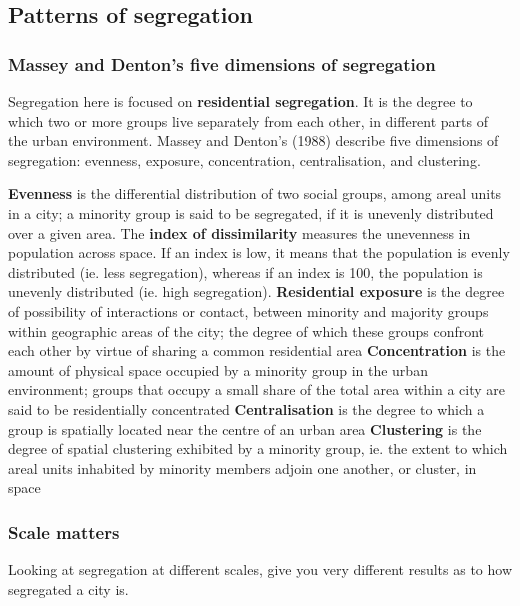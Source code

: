 \documentclass{article}
\begin{document}
\subsection{Patterns of segregation}

\subsubsection{Massey and Denton’s five dimensions of segregation}

Segregation here is focused on \textbf{residential segregation}. It is the degree to which two or more groups live separately from each other, in different parts of the urban environment. Massey and Denton’s (1988) describe five dimensions of segregation: evenness, exposure, concentration, centralisation, and clustering.

\begin{outline}
	\1 \textbf{Evenness} is the differential distribution of two social groups, among areal units in a city; a minority group is said to be segregated, if it is unevenly distributed over a given area.
	The \textbf{index of dissimilarity} measures the unevenness in population across space. If an index is low, it means that the population is evenly distributed (ie. less segregation), whereas if an index is 100, the population is unevenly distributed (ie. high segregation). 
	\1 \textbf{Residential exposure} is the degree of possibility of interactions or contact, between minority and majority groups within geographic areas of the city; the degree of which these groups confront each other by virtue of sharing a common residential area
	\1 \textbf{Concentration} is the amount of physical space occupied by a minority group in the urban environment; groups that occupy a small share of the total area within a city are said to be residentially concentrated
	\1 \textbf{Centralisation} is the degree to which a group is spatially located near the centre of an urban area
	\1 \textbf{Clustering} is the degree of spatial clustering exhibited by a minority group, ie. the extent to which areal units inhabited by minority members adjoin one another, or cluster, in space
\end{outline}

\subsubsection{Scale matters}

Looking at segregation at different scales, give you very different results as to how segregated a city is. 
\end{document}
